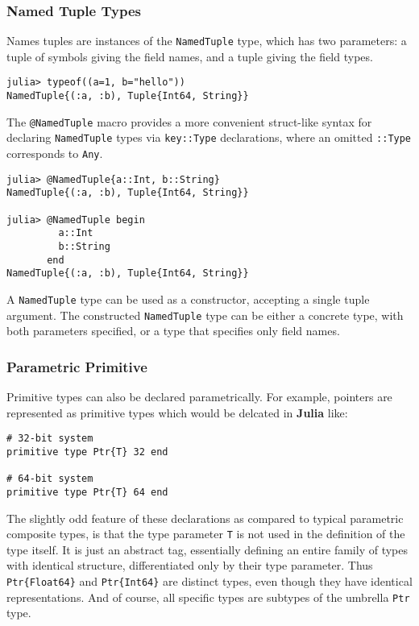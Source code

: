 \documentclass[
]{article}
\begin{document}
\hypertarget{named-tuple-types}{%
\subsubsection{Named Tuple Types}\label{named-tuple-types}}

Names tuples are instances of the \texttt{NamedTuple} type, which has
two parameters: a tuple of symbols giving the field names, and a tuple
giving the field types.

\begin{verbatim}
julia> typeof((a=1, b="hello"))
NamedTuple{(:a, :b), Tuple{Int64, String}}
\end{verbatim}

The \texttt{@NamedTuple} macro provides a more convenient struct-like
syntax for declaring \texttt{NamedTuple} types via \texttt{key::Type}
declarations, where an omitted \texttt{::Type} corresponds to
\texttt{Any}.

\begin{verbatim}
julia> @NamedTuple{a::Int, b::String}
NamedTuple{(:a, :b), Tuple{Int64, String}}

julia> @NamedTuple begin
         a::Int
         b::String
       end
NamedTuple{(:a, :b), Tuple{Int64, String}}
\end{verbatim}

A \texttt{NamedTuple} type can be used as a constructor, accepting a
single tuple argument. The constructed \texttt{NamedTuple} type can be
either a concrete type, with both parameters specified, or a type that
specifies only field names.

\hypertarget{parametric-primitive}{%
\subsubsection{Parametric Primitive}\label{parametric-primitive}}

Primitive types can also be declared parametrically. For example,
pointers are represented as primitive types which would be delcated in
\textbf{Julia} like:

\begin{verbatim}
# 32-bit system
primitive type Ptr{T} 32 end

# 64-bit system
primitive type Ptr{T} 64 end
\end{verbatim}

The slightly odd feature of these declarations as compared to typical
parametric composite types, is that the type parameter \texttt{T} is not
used in the definition of the type itself. It is just an abstract tag,
essentially defining an entire family of types with identical structure,
differentiated only by their type parameter. Thus
\texttt{Ptr\{Float64\}} and \texttt{Ptr\{Int64\}} are distinct types,
even though they have identical representations. And of course, all
specific types are subtypes of the umbrella \texttt{Ptr} type.
\end{document}
